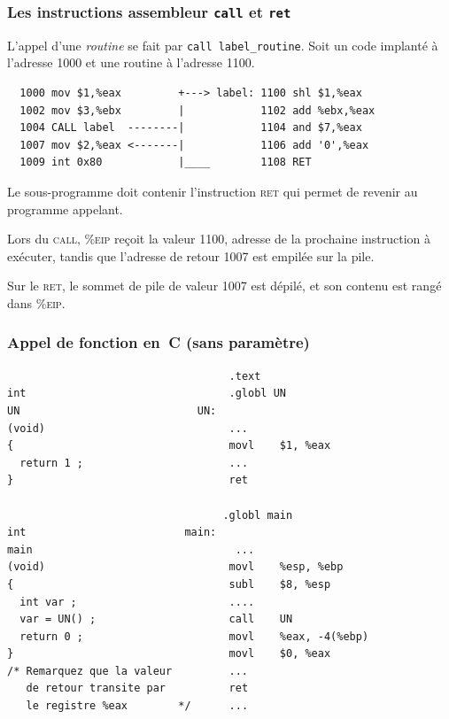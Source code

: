 \begin{frame}[fragile]
  \frametitle{Les instructions assembleur \texttt{call} et
  \texttt{ret}}%

        L'appel d'une \emph{routine} se fait par %
        \verb+call label_routine+. 
        Soit un code implant\'e \`a l'adresse
        1000 et une routine \`a l'adresse 1100.

\begin{verbatim}
  1000 mov $1,%eax         +---> label: 1100 shl $1,%eax    
  1002 mov $3,%ebx         |            1102 add %ebx,%eax    
  1004 CALL label  --------|            1104 and $7,%eax     
  1007 mov $2,%eax <-------|            1106 add '0',%eax   
  1009 int 0x80            |____        1108 RET          
\end{verbatim}
        
Le sous-programme doit contenir l'instruction \textsc{ret} qui permet de revenir au
programme appelant. 


Lors du \textsc{call}, \%\textsc{eip} re\c{c}oit la valeur 1100, adresse de la prochaine
instruction \`a ex\'ecuter, tandis que l'adresse de retour 1007 est
empil\'ee sur la pile.

Sur le \textsc{ret}, le sommet de pile de valeur 1007 est d\'epil\'e, et son
contenu est rang\'e dans \%\textsc{eip}.
\end{frame}
\begin{frame}[fragile]
  \frametitle{Appel de fonction en~C (sans param\`etre)}%
\begin{verbatim}
                                   .text                        
int                                .globl UN                        
UN                            UN:                                
(void)                             ...                        
{                                  movl    $1, %eax        
  return 1 ;                       ...                        
}                                  ret                       
          
                                  .globl main                        
int                         main:                                
main                                ...                        
(void)                             movl    %esp, %ebp        
{                                  subl    $8, %esp        
  int var ;                        ....                        
  var = UN() ;                     call    UN                
  return 0 ;                       movl    %eax, -4(%ebp)        
}                                  movl    $0, %eax        
/* Remarquez que la valeur         ...                        
   de retour transite par          ret                        
   le registre %eax        */      ...                     
\end{verbatim}
\end{frame}
